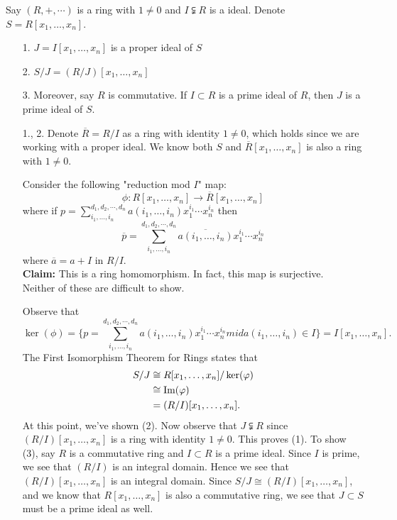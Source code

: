 \begin{proposition}
    Say $(R, +, \cdots)$ is a ring with $1 \ne 0$ and $I
    \subsetneqq R$ is a ideal. Denote $S
    = R[x_1, \dots, x_n]$.
    \begin{itemize}
        \item[1.] $J = I[x_1, \dots, x_n]$ is a proper ideal of $S$
        \item[2.] $S/J = (R/J)[x_1, \dots, x_n]$ 
        \item[3.] Moreover, say $R$ is commutative. If $I \subset
        R$ is a prime ideal of $R$, then $J$ is a prime ideal of
        $S$. 
    \end{itemize}
\end{proposition}

\begin{prf} 
    \begin{itemize}
        \item[1., 2.] Denote $\overline{R} = R/I$ as a ring  with
        identity $1 \ne 0$, which holds since  we are working with
        a proper ideal. We know both $S$ and $\overline{R}[x_1,
        \dots, x_n]$ is also a ring with $1 \ne 0$. 

        Consider the following "reduction mod $I$" map:
        \[
            \phi: R[x_1,\dots, x_n] \to \overline{R}[x_1,\dots, x_n]
        \]
        where if $\displaystyle p = \sum_{i_1, \dots, i_n}^{d_1, d_2,
        \cdots, d_n}a(i_1, \dots, i_n)x_1^{i_1}\cdots x_n^{i_n}$
        then 
        \[
            \overline{p} = \sum_{i_1, \dots, i_n}^{d_1, d_2, \cdots, d_n}\overline{a(i_1, \dots, i_n)}x_1^{i_1}\cdots x_n^{i_n}
        \]
        where $\overline{a} = a + I$ in $R/I$. \\
        \textbf{Claim:} This is a ring homomorphism. In fact, this
        map is surjective. 
        \\
        Neither of these are difficult to show. 

        Observe that 
        \[
            \ker(\phi) = \Big\{p = \sum_{i_1, \dots, i_n}^{d_1, d_2,
            \cdots, d_n}a(i_1, \dots, i_n)x_1^{i_1}\cdots x_n^{i_n} mid a(i_1, \dots, i_n)\in I \Big\}
            = I[x_1, \dots, x_n].
        \]
        The First Isomorphism Theorem for Rings states that 
        \begin{align*}
            S/J &\cong R[x_1, \dots, x_n]/\ker(\varphi)\\
            &\cong \mbox{Im}(\varphi)\\
            &= (R/I)[x_1, \dots, x_n].
        \end{align*}
        At this point, we've shown (2). Now observe that $J
        \subsetneqq R$ since $(R/I)[x_1, \dots, x_n]$ is a ring
        with identity $1 \ne 0$. This proves (1). To show (3), say
        $R$ is a commutative ring and $I \subset R$ is a prime
        ideal. Since $I$ is prime, we see that $(R/I)$ is an
        integral domain. Hence we  see that $(R/I)[x_1, \dots,
        x_n]$ is an integral domain. Since $S/J \cong (R/I)[x_1, \dots,
        x_n]$, and  we know that $R[x_1, \dots, x_n]$ is also a
        commutative ring, we see  that $J \subset S$ must be a
        prime ideal as well. 


    \end{itemize}
\end{prf}   
